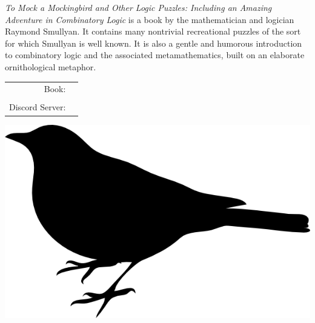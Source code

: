 \documentclass[letterpaper]{article}
\begin{document}


\emph{To Mock a Mockingbird and Other Logic Puzzles: Including an Amazing Adventure in Combinatory Logic} is a book by the mathematician and logician Raymond Smullyan. It contains many nontrivial recreational puzzles of the sort for which Smullyan is well known. It is also a gentle and humorous introduction to combinatory logic and the associated metamathematics, built on an elaborate ornithological metaphor. 

\vspace{0.75in}
\begin{tabular}{rl}
    \csctimefont Book: & \\
    & \\
    \csctimefont Discord Server: & 
\end{tabular}

\vspace{0.5in}
\begin{center}
\includegraphics[scale = 0.75]{mockingbird_logo.png}
\end{center}

\vspace{-15pt}
\vspace{-15pt}
\centering {}
\end{document}
